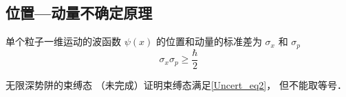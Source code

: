 

\subsection{位置—动量不确定原理}
单个粒子一维运动的波函数 $\psi(x)$ 的位置和动量的标准差为 $\sigma_x$ 和 $\sigma_p$
\begin{equation}\label{Uncert_eq2}
\sigma_x \sigma_p \geqslant \frac{\hbar}{2}
\end{equation}

\begin{example}{无限深势阱的束缚态}\label{Uncert_ex2}
（未完成）证明束缚态满足\autoref{Uncert_eq2}， 但不能取等号．
\end{example}


